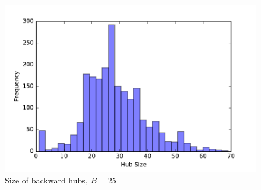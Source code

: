 \begin{figure} \caption{Size of backward hubs, $B=25$}\label{fig:SF_bwd_size}
\begin{center}
\includegraphics[scale=0.5]{TexImg/SF_bwd_hub_size.pdf}
\end{center}
\end{figure}

